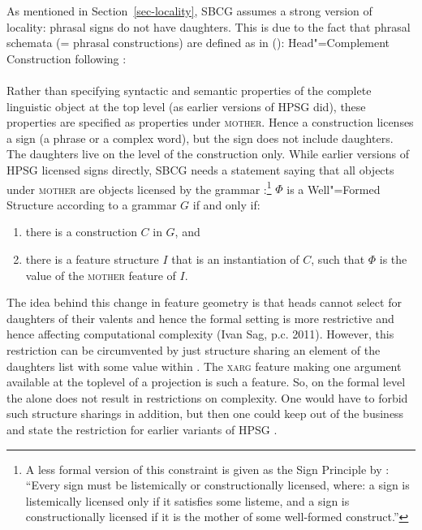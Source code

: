 \documentclass[output=paper]{langsci/langscibook}
\begin{document}
As mentioned in Section~\ref{sec-locality}, SBCG assumes a strong version of locality: phrasal
signs do not have daughters. This is due to the fact that phrasal schemata (= phrasal constructions)
are defined as in ():
\eas
Head"=Complement Construction following \citet[481]{SWB2003a}:\\
 \impl\\
\zs
Rather than specifying syntactic and semantic properties of the complete linguistic object at the
top level (as earlier versions of HPSG did), these properties are specified as properties under \textsc{mother}. Hence a construction
licenses a sign (a phrase or a complex word), but the sign does not include daughters. The daughters live on the level of the
construction only. While earlier versions of HPSG licensed signs directly, SBCG needs a statement
saying that all objects under \textsc{mother} are objects licensed by the grammar \citep*[]{SWB2003a}:\footnote{%
A less formal version of this constraint is given as the Sign Principle by
\citet[]{Sag2012a}: ``Every sign must be listemically or constructionally licensed, where: a
sign is listemically licensed only if it satisfies some listeme, and a sign is constructionally
licensed if it is the mother of some well-formed construct.''
}
\ea
\label{meta-construction-statemnet}
$\Phi$ is a Well"=Formed Structure according to a grammar $G$ if and only if:
\begin{enumerate}
\item there is a construction $C$ in $G$, and
\item there is a feature structure $I$ that is an instantiation of $C$, such that
      $\Phi$ is the value of the \textsc{mother} feature of $I$.
\end{enumerate}
\z
The idea behind this change in feature geometry is that heads cannot select for daughters of their valents and hence
the formal setting is more restrictive and hence affecting computational complexity (Ivan Sag,
p.c. 2011). However, this restriction can be circumvented by just structure sharing an element of
the daughters list with some value within \mother. The \textsc{xarg} feature making one argument
available at the toplevel of a projection \citep{BF99a} is such a feature. So, on the formal level the \motherf alone does not
result in restrictions on complexity. One would have to forbid such structure sharings in addition,
but then one could keep \mother out of the business and state the restriction for earlier variants
of HPSG \citep[Section~10.6.2.1.3]{MuellerGT-Eng2}.
\end{document}

